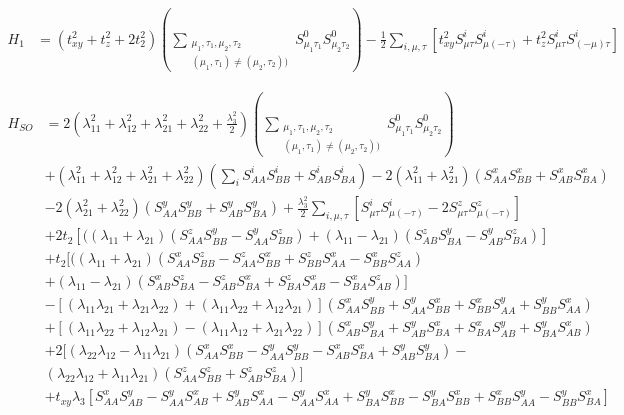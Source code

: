 \documentclass[prb,aps,amssymb,twocolumn,notitlepage]{revtex4-2}
\begin{document}
\begin{align}
H_{1}&=(t^2_{xy}+t^2_{z}+2t^2_{2})\left(\sum_{\substack{\mu_1,\tau_1,\mu_2,\tau_2\\(\mu_1,\tau_1)\neq(\mu_2,\tau_2))}}S^{0}_{\mu_{1}\tau_{1}}S^{0}_{\mu_{2}\tau_{2}}\right)-\frac{1}{2}\sum_{i,\mu,\tau}\left[t^2_{xy}S^{i}_{\mu\tau}S^{i}_{\mu(-\tau)}
+t^2_{z}S^{i}_{\mu\tau}S^{i}_{(-\mu)\tau}\right]
\end{align}

\begin{align}
H_{SO}&=2\left(\lambda_{11}^2+\lambda_{12}^2+\lambda_{21}^2+\lambda_{22}^2+\frac{\lambda_{3}^2}{2}\right)\left(\sum_{\substack{\mu_1,\tau_1,\mu_2,\tau_2\\(\mu_1,\tau_1)\neq(\mu_2,\tau_2))}}S^{0}_{\mu_{1}\tau_{1}}S^{0}_{\mu_{2}\tau_{2}}\right) \\
&+\left(\lambda_{11}^2+\lambda_{12}^2+\lambda_{21}^2+\lambda_{22}^2\right)\left(\sum_{i}S^{i}_{AA}S^{i}_{BB}+S^{i}_{AB}S^{i}_{BA}\right)-2(\lambda^2_{11}+\lambda^{2}_{21})(S^{x}_{AA}S^{x}_{BB}+S^{x}_{AB}S^{x}_{BA}) \nonumber \\
&-2(\lambda^2_{21}+\lambda^{2}_{22})(S^{y}_{AA}S^{y}_{BB}+S^{y}_{AB}S^{y}_{BA})+\frac{\lambda^{2}_3}{2}\sum_{i,\mu,\tau}\left[S^{i}_{\mu\tau}S^{i}_{\mu(-\tau)}-2S^{z}_{\mu\tau}S^{z}_{\mu(-\tau)}\right] \nonumber\\
&+2t_{2}\left[
((\lambda_{11}+\lambda_{21})(S^{z}_{AA}S^{y}_{BB}-S^{y}_{AA}S^{z}_{BB})+(\lambda_{11}-\lambda_{21})(S^{z}_{AB}S^{y}_{BA}-S^{y}_{AB}S^{z}_{BA})
\right]\nonumber \\
&+t_{2}\bigg[
((\lambda_{11}+\lambda_{21})(S^{x}_{AA}S^{z}_{BB}-S^{z}_{AA}S^{x}_{BB}+S^{z}_{BB}S^{x}_{AA}-S^{x}_{BB}S^{z}_{AA})\nonumber \\
&+(\lambda_{11}-\lambda_{21})(S^{x}_{AB}S^{z}_{BA}-S^{z}_{AB}S^{x}_{BA}+S^{z}_{BA}S^{x}_{AB}-S^{x}_{BA}S^{z}_{AB})\bigg]\nonumber \\
&-\left[(\lambda_{11}\lambda_{21}+\lambda_{21}\lambda_{22})+(\lambda_{11}\lambda_{22}+\lambda_{12}\lambda_{21})\right]
(S^{x}_{AA}S^{y}_{BB}+S^{y}_{AA}S^{x}_{BB}+S^{x}_{BB}S^{y}_{AA}+S^{y}_{BB}S^{x}_{AA}) \nonumber\\
&+\left[(\lambda_{11}\lambda_{22}+\lambda_{12}\lambda_{21})-(\lambda_{11}\lambda_{12}+\lambda_{21}\lambda_{22})\right]
(S^{x}_{AB}S^{y}_{BA}+S^{y}_{AB}S^{x}_{BA}+S^{x}_{BA}S^{y}_{AB}+S^{y}_{BA}S^{x}_{AB})\nonumber\\
&+2\bigg[(\lambda_{22}\lambda_{12}-\lambda_{11}\lambda_{21})(S^{x}_{AA}S^{x}_{BB}-S^{y}_{AA}S^{y}_{BB}-S^{x}_{AB}S^{x}_{BA}+S^{y}_{AB}S^{y}_{BA})-\nonumber\\
&(\lambda_{22}\lambda_{12}+\lambda_{11}\lambda_{21})(S^{z}_{AA}S^{z}_{BB}+S^{z}_{AB}S^{z}_{BA})\bigg] \nonumber \\
&+t_{xy}\lambda_{3}\left[
    S_{AA}^{x}S_{AB}^{y}-S_{AA}^{y}S_{AB}^{x}
    +S_{AB}^{y}S_{AA}^{x}-S_{AA}^{y}S_{AA}^{x}
    +S_{BA}^{y}S_{BB}^{x}-S_{BA}^{y}S_{BB}^{x}
    +S_{BB}^{x}S_{AA}^{y}-S_{BB}^{y}S_{BA}^{x}
    \right]
\end{align} 
\end{document}
